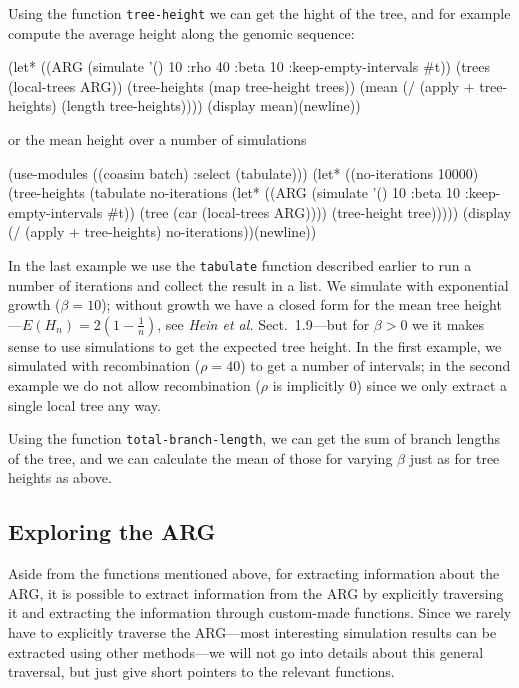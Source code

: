 \documentclass{manual}
\begin{document}
Using the function \texttt{tree-height} we can get the hight of the
tree, and for example compute the average height along the genomic
sequence:
\begin{code}
(let* ((ARG (simulate '() 10 :rho 40 :beta 10 :keep-empty-intervals #t))
       (trees (local-trees ARG))
       (tree-heights (map tree-height trees))
       (mean (/ (apply + tree-heights) (length tree-heights))))
  (display mean)(newline))
\end{code}
or the mean height over a number of simulations
\begin{code}
(use-modules ((coasim batch) :select (tabulate)))
(let* ((no-iterations 10000)
       (tree-heights
        (tabulate no-iterations
                  (let* ((ARG (simulate '() 10
                                        :beta 10
                                        :keep-empty-intervals #t))
                         (tree (car (local-trees ARG))))
                    (tree-height tree)))))
  (display (/ (apply + tree-heights) no-iterations))(newline))
\end{code}

In the last example we use the \texttt{tabulate} function described
earlier to run a number of iterations and collect the result in a
list.  We simulate with exponential growth ($\beta=10$); without
growth we have a closed form for the mean tree
height---$E(H_n)=2\left(1-\frac{1}{n}\right)$, see \emph{Hein et al.}
Sect.~1.9---but for $\beta>0$ we it makes sense to use simulations to
get the expected tree height.  In the first example, we simulated with
recombination ($\rho=40$) to get a number of intervals; in the second
example we do not allow recombination ($\rho$ is implicitly $0$) since
we only extract a single local tree any way.

Using the function \texttt{total-branch-length}, we can get the sum of
branch lengths of the tree, and we can calculate the mean of those for
varying $\beta$ just as for tree heights as above.


\subsection{Exploring the ARG}
\label{sec:exploring-arg}

Aside from the functions mentioned above, for extracting information
about the ARG, it is possible to extract information from the ARG by
explicitly traversing it and extracting the information through
custom-made functions.  Since we rarely have to explicitly traverse
the ARG---most interesting simulation results can be extracted using
other methods---we will not go into details about this general
traversal, but just give short pointers to the relevant functions.
\end{document}
